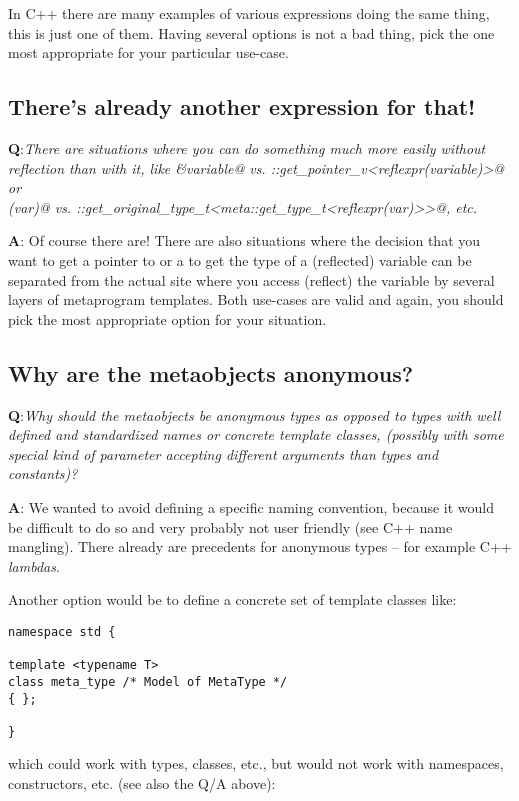 In C++ there are many examples of various expressions doing the same thing,
this is just one of them.
Having several options is not a bad thing, pick the one most appropriate for your
particular use-case.


\subsection{There's already another expression for that!}

{\textbf Q:}{\em There are situations where you can do something much more
easily without reflection than with it, like \verb@&variable@ vs.
\verb@meta::get_pointer_v<reflexpr(variable)>@ or\\\verb@decltype(var)@ vs.
\verb@meta::get_original_type_t<meta::get_type_t<reflexpr(var)>>@, etc.}

{\textbf A:} Of course there are! There are also situations where the decision
that you want to get a pointer to or a to get the type of a (reflected) variable
can be separated from the actual site where you access (reflect) the variable by
several layers of metaprogram templates. Both use-cases are valid and
again, you should pick the most appropriate option for your situation.

\subsection{Why are the metaobjects anonymous?}

{\textbf Q:}{\em Why should the metaobjects be anonymous types as opposed to
types with well defined and standardized names or concrete template classes, (possibly with some
special kind of parameter accepting different arguments than types and constants)?}

{\textbf A:} We wanted to avoid defining a specific naming convention, because it would
be difficult to do so and very probably not user friendly (see C++ name mangling). There
already are precedents for anonymous types -- for example C++ {\em lambdas}.

Another option would be to define a concrete set of template classes like:

\begin{verbatim}
namespace std {

template <typename T>
class meta_type /* Model of MetaType */
{ };

}
\end{verbatim}

which could work with types, classes, etc., but would not work with namespaces,
constructors, etc. (see also the Q/A above):

